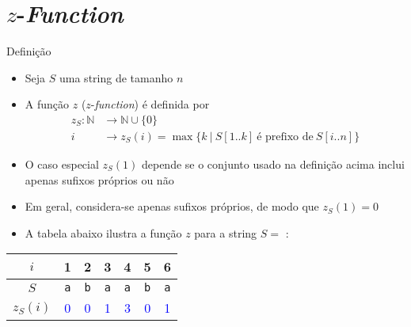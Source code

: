 \section{$z$-{\it Function}}

\begin{frame}[fragile]{Definição}

    \begin{itemize}
        \item Seja $S$ uma string de tamanho $n$
        \pause

        \item A função $z$ ($z$-\textit{function}) é definida por
        \begin{align*}
            z_S: \mathbb{N} & \to \mathbb{N}\cup \lbrace 0\rbrace \\
               i & \to z_S(i) = \max\lbrace k\ |\ S[1..k]\ \mbox{é prefixo de}\ S[i..n] \rbrace
        \end{align*}
        \pause

        \item O caso especial $z_S(1)$ depende se o conjunto usado na definição acima inclui
            apenas sufixos próprios ou não
        \pause

        \item Em geral, considera-se apenas sufixos próprios, de modo que $z_S(1) = 0$
        \pause

        \item A tabela abaixo ilustra a função $z$ para a string $S = $ :
    \end{itemize}

    \begin{center}
        \begin{tabular}{c|cccccc}
        $i$ & 1 & 2 & 3 & 4 & 5 & 6 \\
        \hline
        $S$ & \texttt{\textcolor{red!80!black}{a}} & \texttt{\textcolor{red!80!black}{b}} & \texttt{\textcolor{red!80!black}{a}} & \texttt{\textcolor{red!80!black}{a}} & \texttt{\textcolor{red!80!black}{b}} & \texttt{\textcolor{red!80!black}{a}} \\
        $z_S(i)$ & \textcolor{blue}{0} & \textcolor{blue}{0} & \textcolor{blue}{1} & \textcolor{blue}{3} & \textcolor{blue}{0} & \textcolor{blue}{1} \\
        \end{tabular}
    \end{center}
\end{frame}

